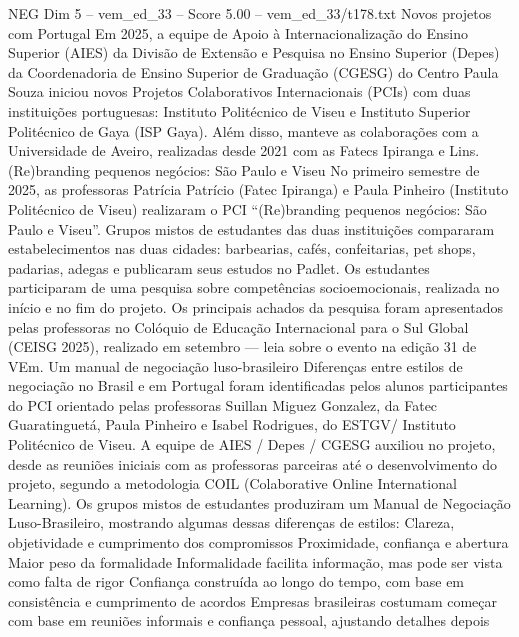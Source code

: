 \begin{textsample}{NEG Dim 5 – vem\_ed\_33 – Score 5.00 – vem\_ed\_33/t178.txt}  \label{ex:f5_neg_074}
Novos projetos com Portugal Em 2025, a equipe de Apoio à Internacionalização do Ensino Superior (AIES) da Divisão de Extensão e Pesquisa no Ensino Superior (Depes) da Coordenadoria de Ensino Superior de Graduação (CGESG) do Centro Paula Souza iniciou novos Projetos Colaborativos Internacionais (PCIs) com duas instituições portuguesas: Instituto Politécnico de Viseu e Instituto Superior Politécnico de Gaya (ISP Gaya).
Além disso, manteve as colaborações com a Universidade de Aveiro, realizadas desde 2021 com as Fatecs Ipiranga e Lins. (Re)branding pequenos negócios: São Paulo e Viseu No primeiro semestre de 2025, as professoras Patrícia Patrício (Fatec Ipiranga) e Paula Pinheiro (Instituto Politécnico de Viseu) realizaram o PCI “(Re)branding pequenos negócios: São Paulo e Viseu”.
Grupos mistos de estudantes das duas instituições compararam estabelecimentos nas duas cidades: barbearias, cafés, confeitarias, pet shops, padarias, adegas e publicaram seus estudos no Padlet.
Os estudantes participaram de uma pesquisa sobre competências socioemocionais, realizada no início e no fim do projeto.
Os principais achados da pesquisa foram apresentados pelas professoras no Colóquio de Educação Internacional para o Sul Global (CEISG 2025), realizado em setembro — leia sobre o evento na edição 31 de VEm.
Um manual de negociação luso-brasileiro Diferenças entre estilos de negociação no Brasil e em Portugal foram identificadas pelos alunos participantes do PCI orientado pelas professoras Suillan Miguez Gonzalez, da Fatec Guaratinguetá, Paula Pinheiro e Isabel Rodrigues, do ESTGV/ Instituto Politécnico de Viseu.
A equipe de AIES / Depes / CGESG auxiliou no projeto, desde as reuniões iniciais com as professoras parceiras até o desenvolvimento do projeto, segundo a metodologia COIL (Colaborative Online International Learning).
Os grupos mistos de estudantes produziram um Manual de Negociação Luso-Brasileiro, mostrando algumas dessas diferenças de estilos: Clareza, objetividade e cumprimento dos compromissos Proximidade, confiança e abertura Maior peso da formalidade Informalidade facilita informação, mas pode ser vista como falta de rigor Confiança construída ao longo do tempo, com base em consistência e cumprimento de acordos Empresas brasileiras costumam começar com base em reuniões informais e confiança pessoal, ajustando detalhes depois

\end{textsample}
